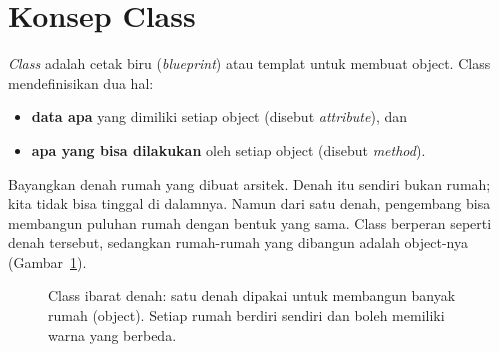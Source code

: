 \section{Konsep Class}

\emph{Class} adalah cetak biru (\emph{blueprint}) atau templat untuk membuat object. Class mendefinisikan dua hal:

\begin{itemize}
  \item \textbf{data apa} yang dimiliki setiap object (disebut \emph{attribute}), dan
  \item \textbf{apa yang bisa dilakukan} oleh setiap object (disebut \emph{method}).
\end{itemize}

Bayangkan denah rumah yang dibuat arsitek. Denah itu sendiri bukan rumah; kita tidak bisa tinggal di dalamnya. Namun dari satu denah, pengembang bisa membangun puluhan rumah dengan bentuk yang sama. Class berperan seperti denah tersebut, sedangkan rumah-rumah yang dibangun adalah object-nya (Gambar~\ref{fig:b1-denah}).

\begin{figure}[htbp]
\centering
{}
\caption{Class ibarat denah: satu denah dipakai untuk membangun banyak rumah (object). Setiap rumah berdiri sendiri dan boleh memiliki warna yang berbeda.}
\label{fig:b1-denah}
\end{figure}

